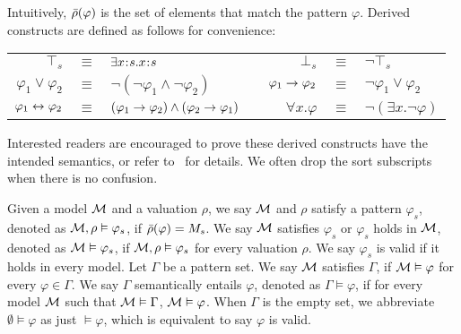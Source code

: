 \documentclass{amsart}
\begin{document}
Intuitively,
$\bar{\rho}(\varphi)$ 
is the set of elements that match the pattern $\varphi$.
Derived constructs are defined as follows for convenience:
\begin{center}
	\begin{tabular}{rclp{1cm}rcl}
		$\top_s$ & $\equiv$ & $\exists x \mathbin{\!:\!} s . x \mathbin{\!:\!} s$
		&&
		$\bot_s$ & $\equiv$ & $\neg \top_s$
		\\
		$\varphi_1 \vee \varphi_2$ & $\equiv$ & 
		$\neg (\neg \varphi_1 \wedge \neg \varphi_2)$
		&&
		$\varphi_1 \to \varphi_2$ & $\equiv$ &
		$\neg \varphi_1 \vee \varphi_2$
		\\
		$\varphi_1 \leftrightarrow \varphi_2$ & $\equiv$ &
		$(\varphi_1 \to \varphi_2) \wedge (\varphi_2 \to \varphi_1)$
		&&
		$\forall x . \varphi$ & $\equiv$ &
		$\neg (\exists x . \neg \varphi)$
	\end{tabular}
\end{center}
Interested readers are encouraged to prove these derived constructs
have the intended semantics,
or refer to~\cite{bibid} for details.
We often drop the sort subscripts when there is no confusion.

Given a model $\mathcal{M}$ and a valuation $\rho$,
we say $\mathcal{M}$ and $\rho$ satisfy a pattern $\varphi_s$,
denoted as $\mathcal{M},\rho \vDash \varphi_s$,
if $\bar{\rho}(\varphi) = M_s$.
We say $\mathcal{M}$ satisfies $\varphi_s$
or $\varphi_s$ holds in $\mathcal{M}$,
denoted as $\mathcal{M} \vDash \varphi_s$,
if $\mathcal{M} , \rho \vDash \varphi_s$ for every valuation $\rho$.
We say $\varphi_s$ is valid if
it holds in every model.
Let $\Gamma$ be a pattern set.
We say $\mathcal{M}$ satisfies $\Gamma$, if
$\mathcal{M} \vDash \varphi$ for every $\varphi \in \Gamma$.
We say $\Gamma$ semantically entails $\varphi$,
denoted as $\Gamma \vDash \varphi$,
if for every model $\mathcal{M}$ such that $\mathcal{M} \vDash \Gamma$,
$\mathcal{M} \vDash \varphi$.
When $\Gamma$ is the empty set, we abbreviate
$\emptyset \vDash \varphi$ as just $\vDash \varphi$,
which is equivalent to say $\varphi$ is valid.
\end{document}
